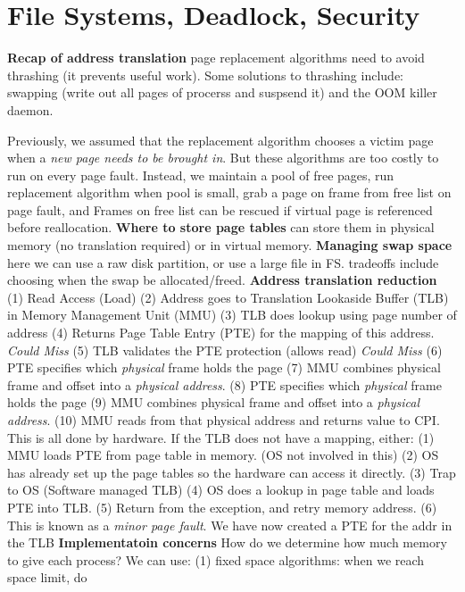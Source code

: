 \section{File Systems, Deadlock, Security}

{\bf Recap of address
translation}
page replacement algorithms need to avoid thrashing (it prevents useful work). Some solutions
to thrashing include: swapping (write out all pages of procerss and suspsend it) and the OOM killer daemon.

Previously, we assumed that the replacement algorithm chooses a victim page
when a \emph{new page needs to be brought in}. But these algorithms are too
costly to run on every page fault. Instead, we maintain a pool of free pages,
run replacement algorithm when pool is small, grab a page on frame from free
list on page fault, and Frames on free list can be rescued if virtual page is
referenced before reallocation.
{\bf Where to store page
tables } can store them in physical memory (no translation required) or in virtual memory.
{\bf Managing swap space} here we can use a raw disk partition, or use a large
file in FS. tradeoffs include choosing when the swap be allocated/freed.  {\bf
Address translation reduction} (1)  Read Access (Load)
  (2) Address goes to Translation Lookaside Buffer (TLB) in Memory
  Management Unit (MMU)
  (3) TLB does lookup using page number of address
  (4) Returns Page Table Entry (PTE) for the mapping of this address.
    \emph{Could Miss}
  (5)  TLB validates the PTE protection (allows read) \emph{Could Miss}
    (6)  PTE specifies which \emph{physical} frame holds the page
    (7) MMU combines physical frame and offset into a \emph{physical
    address}.
    (8) PTE specifies which \emph{physical} frame holds the page
    (9) MMU combines physical frame and offset into a \emph{physical
    address}.
    (10) MMU reads from that physical address and returns value to CPI.
  This is all done by hardware.
  If the TLB does not have a mapping, either:
    (1)  MMU loads PTE from page table in memory. (OS not involved in this)
    (2) OS has already set up the page tables so the hardware can access it
    directly.
    (3) Trap to OS (Software managed TLB)
    (4) OS does a lookup in page table and loads PTE into TLB.
    (5) Return from the exception, and retry memory address.
    (6) This is known as a \emph{minor page fault}. We have now created a
    PTE for the addr in the TLB
{\bf Implementatoin concerns} How do we determine how much memory to give each
process? We can use: (1) fixed space algorithms: when we reach space limit, do
